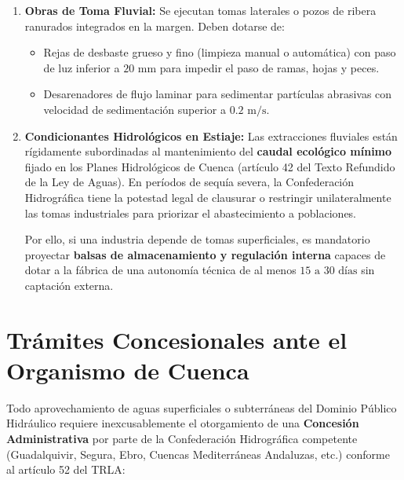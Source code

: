 \documentclass{report}
\begin{document}
\begin{enumerate}

    \item \textbf{Obras de Toma Fluvial:} Se ejecutan tomas laterales o pozos de ribera ranurados integrados en la margen. Deben dotarse de:

    \begin{itemize}

        \item Rejas de desbaste grueso y fino (limpieza manual o automática) con paso de luz inferior a $20\text{ mm}$ para impedir el paso de ramas, hojas y peces.

        \item Desarenadores de flujo laminar para sedimentar partículas abrasivas con velocidad de sedimentación superior a $0.2\text{ m/s}$.

    \end{itemize}

    \item \textbf{Condicionantes Hidrológicos en Estiaje:} Las extracciones fluviales están rígidamente subordinadas al mantenimiento del \textbf{caudal ecológico mínimo} fijado en los Planes Hidrológicos de Cuenca (artículo 42 del Texto Refundido de la Ley de Aguas). En períodos de sequía severa, la Confederación Hidrográfica tiene la potestad legal de clausurar o restringir unilateralmente las tomas industriales para priorizar el abastecimiento a poblaciones.



    Por ello, si una industria depende de tomas superficiales, es mandatorio proyectar \textbf{balsas de almacenamiento y regulación interna} capaces de dotar a la fábrica de una autonomía técnica de al menos $15\text{ a }30\text{ días}$ sin captación externa.

\end{enumerate}



\section{Trámites Concesionales ante el Organismo de Cuenca}

Todo aprovechamiento de aguas superficiales o subterráneas del Dominio Público Hidráulico requiere inexcusablemente el otorgamiento de una \textbf{Concesión Administrativa} por parte de la Confederación Hidrográfica competente (Guadalquivir, Segura, Ebro, Cuencas Mediterráneas Andaluzas, etc.) conforme al artículo 52 del TRLA:
\end{document}
